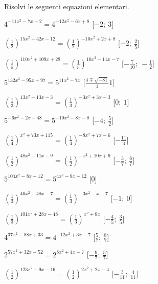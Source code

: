\begin{esercizio}\label{ese:}
 Risolvi le seguenti equazioni elementari.
 \begin{enumeratea}
  \item  \(4^{-11 x^2 -7 x +2} = 4^{-12 x^2 -6 x +8}\)
   \hfill [\(-2;~3\)]
  \item  \(\left(\frac{1}{2}\right)^{15 x^2 +42 x -12} = 
\left(\frac{1}{2}\right)^{-10 x^2 +2 x +8}\)
   \hfill [\(-2;~\frac{2}{5}\)]
  \item  \(\left(\frac{1}{5}\right)^{110 x^2 +109 x +28} = 
\left(\frac{1}{5}\right)^{10 x^2 -11 x -7}\)
   \hfill [\(-\frac{7}{10};~-\frac{1}{2}\)]
  \item  \(5^{132 x^2 -95 x +97} = 5^{11 x^2 -7 x }\)
   \hfill [\(\frac{4 \mp \sqrt{-81}} 11\)]
  \item  \(\left(\frac{1}{3}\right)^{13 x^2 -13 x -3} = 
\left(\frac{1}{3}\right)^{-3 x^2 +3 x -3}\)
   \hfill [\(0;~1\)]
  \item  \(5^{-6 x^2 -2 x -48} = 5^{-10 x^2 -8 x -8}\)
   \hfill [\(-4;~\frac{5}{2}\)]
  \item  \(\left(\frac{1}{4}\right)^{x^2 +73 x +115} = 
\left(\frac{1}{4}\right)^{-8 x^2 +7 x -6}\)
   \hfill [\(-\frac{11}{3}\)]
  \item  \(\left(\frac{1}{2}\right)^{48 x^2 -11 x -9} = 
\left(\frac{1}{2}\right)^{- x^2 +10 x +9}\)
   \hfill [\(-\frac{3}{7};~\frac{6}{7}\)]
  \item  \(5^{104 x^2 -8 x -12} = 5^{4 x^2 -8 x -12}\)
   \hfill [\(0\)]
  \item  \(\left(\frac{1}{3}\right)^{46 x^2 +48 x -7} = 
\left(\frac{1}{3}\right)^{-3 x^2 - x -7}\)
   \hfill [\(-1;~0\)]
  \item  \(\left(\frac{1}{3}\right)^{101 x^2 +28 x -48} = 
\left(\frac{1}{3}\right)^{x^2 +8 x }\)
   \hfill [\(-\frac{4}{5};~\frac{3}{5}\)]
  \item  \(4^{37 x^2 -88 x +33} = 4^{-12 x^2 +3 x -7}\)
   \hfill [\(\frac{5}{7};~\frac{8}{7}\)]
  \item  \(2^{57 x^2 +32 x -52} = 2^{8 x^2 +4 x -7}\)
   \hfill [\(-\frac{9}{7};~\frac{5}{7}\)]
  \item  \(\left(\frac{1}{2}\right)^{123 x^2 -9 x -16} = 
\left(\frac{1}{2}\right)^{2 x^2 +2 x -4}\)
   \hfill [\(-\frac{3}{11};~\frac{4}{11}\)]
 \end{enumeratea}
\end{esercizio}


